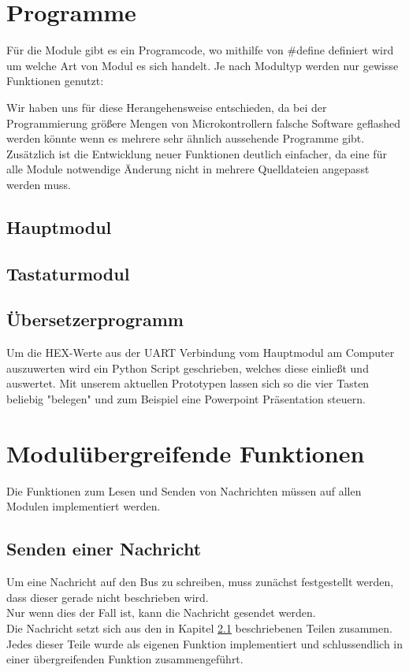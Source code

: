 \section{Programme}
Für die Module gibt es ein Programcode, wo mithilfe von \#define definiert wird um welche Art von Modul es sich handelt. Je nach Modultyp werden nur gewisse Funktionen genutzt:


Wir haben uns für diese Herangehensweise entschieden, da bei der Programmierung größere Mengen von Microkontrollern falsche Software geflashed werden könnte wenn es mehrere sehr ähnlich aussehende Programme gibt. Zusätzlich ist die Entwicklung neuer Funktionen deutlich einfacher, da eine für alle Module notwendige Änderung nicht in mehrere Quelldateien angepasst werden muss.


\subsection{Hauptmodul}


\subsection{Tastaturmodul}
\subsection{Übersetzerprogramm}
Um die HEX-Werte aus der UART Verbindung vom Hauptmodul am Computer auszuwerten wird ein Python Script geschrieben, welches diese einließt und auswertet. Mit unserem aktuellen Prototypen lassen sich so die vier Tasten beliebig "belegen" und zum Beispiel eine Powerpoint Präsentation steuern.
\\

\section{Modulübergreifende Funktionen}
\textmd{Die Funktionen zum Lesen und Senden von Nachrichten müssen auf allen Modulen implementiert werden.\\
}
\subsection{Senden einer Nachricht}
\textmd{Um eine Nachricht auf den Bus zu schreiben, muss zunächst festgestellt werden, dass dieser gerade nicht beschrieben wird.\\
	Nur wenn dies der Fall ist, kann die Nachricht gesendet werden. \\
	Die Nachricht setzt sich aus den in Kapitel \ref{} beschriebenen Teilen zusammen. Jedes dieser Teile wurde als eigenen Funktion implementiert und schlussendlich in einer übergreifenden Funktion zusammengeführt.\\
}

